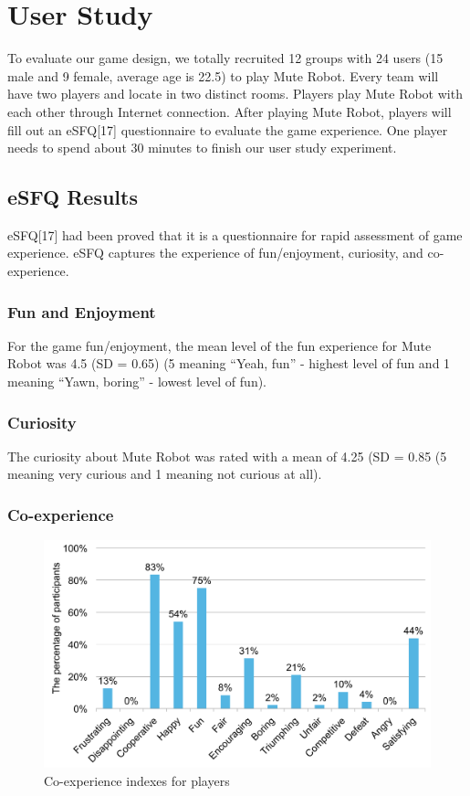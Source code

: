 \documentclass{sigchi}
\begin{document}
\section{User Study}
To evaluate our game design, we totally recruited 12 groups with 24 users (15 male and 9 female, average age is 22.5) to play Mute Robot. Every team will have two players and locate in two distinct rooms. 
Players play Mute Robot with each other through Internet connection. After playing Mute Robot, players will fill out an eSFQ[17] questionnaire to evaluate the game experience. One player needs to spend about 30 minutes to finish our user study experiment. 

\subsection{eSFQ Results}
eSFQ[17] had been proved that it is a questionnaire for rapid assessment of game experience. eSFQ captures the experience of fun/enjoyment, curiosity, and co-experience. 

\subsubsection{Fun and Enjoyment}
For the game fun/enjoyment, the mean level of the fun experience for Mute Robot was 4.5 (SD = 0.65) (5 meaning “Yeah, fun” - highest level of fun and 1 meaning “Yawn, boring” - lowest level of fun). 

\subsubsection{Curiosity}
The curiosity about Mute Robot was rated with a mean of 4.25 (SD = 0.85 (5 meaning very curious and 1 meaning not curious at all).

\subsubsection{Co-experience}

\begin{figure}[!h]
\centering
\includegraphics[width=1.0\columnwidth]{Figures/US_F1.pdf}
\caption{Co-experience indexes for players}
\label{fig:US_F1}
\end{figure}
\end{document}

